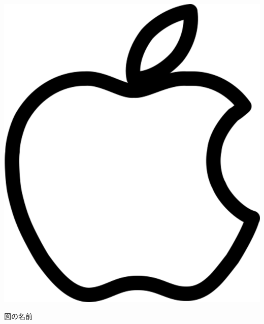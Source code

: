 	\begin{fig}
	    \includegraphics[scale=0.4, clip]{./img/apple.png}
	    \caption{図の名前}
	    \label{fig:図の名前}
	\end{fig}